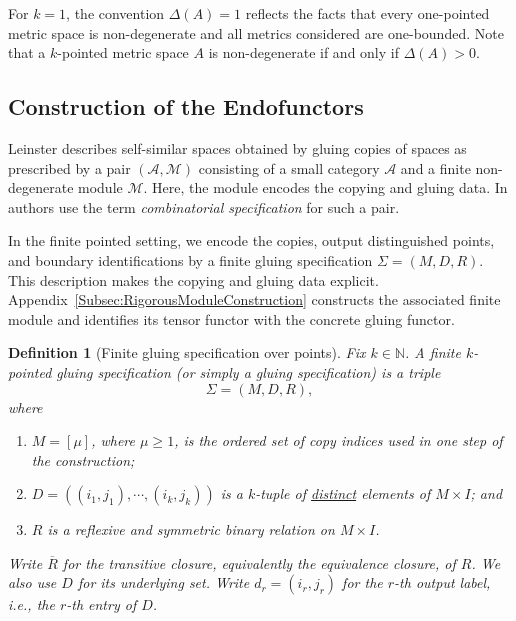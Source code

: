 \documentclass{sn-jnl}%
\theoremstyle{thmstyleone}%
\theoremstyle{thmstyletwo}%
\theoremstyle{thmstylethree}%
\newtheorem{definition}{Definition}%
\newcommand{\s}{\mu}
\begin{document}
For $k=1$, the convention $\Delta(A)=1$ reflects the facts that every one-pointed metric space is non-degenerate and all metrics considered are one-bounded. Note that a $k$-pointed metric space $A$ is non-degenerate if and only if $\Delta(A)>0$.

\subsection{Construction of the Endofunctors}
Leinster \cite{Lein}  describes self-similar spaces obtained by gluing copies of spaces as prescribed by a pair $(\mathcal A,\mathcal M)$ consisting of a small category $\mathcal A$  and a finite non-degenerate module  $\mathcal M$. Here, the module encodes the copying and gluing data. In \cite{coalge_representation} authors use the term \emph{combinatorial specification} for such a pair. 

In the finite pointed setting, we encode the copies, output distinguished points, and boundary identifications by a finite gluing specification $\Sigma=(M,D,R)$. This description makes the copying and gluing data explicit. Appendix~\ref{Subsec:RigorousModuleConstruction} constructs the associated finite module and identifies its tensor functor with the concrete gluing functor. 

\begin{definition}[Finite gluing specification over points]
\label{Def_FiniteGluingSpecification}
    Fix $k\in\mathbb N$.  A \emph{finite $k$-pointed gluing specification} (or simply a \emph{gluing specification}) is a triple
    \begin{equation} 
    \nonumber
        \Sigma=(M,D,R),
    \end{equation}
    where
    \begin{enumerate}
        \item $M=[\s]$, where $\s\geq1$, is the ordered set of copy indices used in one step of the construction;
        \item $D=\left((i_1,j_1),\cdots,(i_k,j_k)\right)$ is a $k$-tuple of \underline{distinct} elements of $M\times I$; and
        \item $R$ is a reflexive and symmetric binary relation on $M\times I$.
    \end{enumerate}
    Write $\overline R$ for the transitive closure, equivalently the equivalence closure, of $R$. We also use $D$ for its underlying set. Write $d_r=(i_r, j_r)$ for the $r$-th \textit{output label}, i.e., the $r$-th entry of $D$.
\end{definition}
\end{document}
